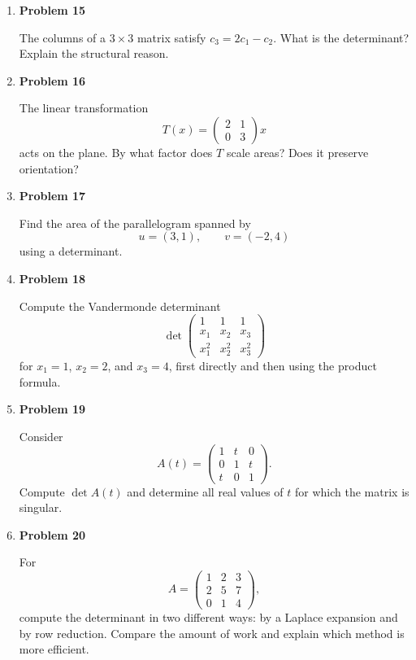 \begin{enumerate}
\item \textbf{Problem 15}\par
The columns of a \(3\times3\) matrix satisfy \(c_3=2c_1-c_2\). What is the determinant? Explain the structural reason.

\item \textbf{Problem 16}\par
The linear transformation
\[
T(x)=
\begin{pmatrix}
2&1\\
0&3
\end{pmatrix}x
\]
acts on the plane. By what factor does \(T\) scale areas? Does it preserve orientation?

\item \textbf{Problem 17}\par
Find the area of the parallelogram spanned by
\[
u=(3,1),
\qquad
v=(-2,4)
\]
using a determinant.

\item \textbf{Problem 18}\par
Compute the Vandermonde determinant
\[
\det\begin{pmatrix}
1&1&1\\
x_1&x_2&x_3\\
x_1^2&x_2^2&x_3^2
\end{pmatrix}
\]
for \(x_1=1\), \(x_2=2\), and \(x_3=4\), first directly and then using the product formula.

\item \textbf{Problem 19}\par
Consider
\[
A(t)=\begin{pmatrix}
1&t&0\\
0&1&t\\
t&0&1
\end{pmatrix}.
\]
Compute \(\det A(t)\) and determine all real values of \(t\) for which the matrix is singular.

\item \textbf{Problem 20}\par
For
\[
A=\begin{pmatrix}
1&2&3\\
2&5&7\\
0&1&4
\end{pmatrix},
\]
compute the determinant in two different ways: by a Laplace expansion and by row reduction. Compare the amount of work and explain which method is more efficient.
\end{enumerate}
